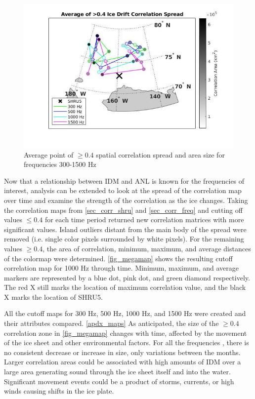 \begin{figure}[p]
\centering
\includegraphics[scale=0.5]{Figures/avg_corr_summary.jpg}
\caption{Average point of $\geq 0.4$ spatial correlation spread and area size for frequencies 300-1500 Hz}
\label{fig_avgmap}
\end{figure}

Now that a relationship between IDM and ANL is known for the frequencies of interest, analysis can be extended to look at the spread of the correlation map over time and examine the strength of the correlation as the ice changes. Taking the correlation maps from \autoref{sec_corr_shru} and \autoref{sec_corr_freq} and cutting off values $\leq 0.4$ for each time period returned new correlation matrices with more significant values. Island outliers distant from the main body of the spread were removed (i.e. single color pixels surrounded by white pixels). For the remaining values $\geq 0.4$, the area of correlation, minimum, maximum, and average distances of the colormap were determined. \autoref{fig_megamap} shows the resulting cutoff correlation map for 1000 Hz through time. Minimum, maximum, and average markers are represented by a blue dot, pink dot, and green diamond respectively. The red X still marks the location of maximum correlation value, and the black X marks the location of SHRU5.

All the cutoff maps for 300 Hz, 500 Hz, 1000 Hz, and 1500 Hz were created and their attributes compared. \autoref{apdx_maps} As anticipated, the size of the $\geq 0.4$ correlation zone in \autoref{fig_megamap} changes with time, affected by the movement of the ice sheet and other environmental factors. For all the frequencies , there is no consistent decrease or increase in size, only variations between the months. Larger correlation areas could be associated with high amounts of IDM over a large area generating sound through the ice sheet itself and into the water. Significant movement events could be a product of storms, currents, or high winds causing shifts in the ice plate. %

